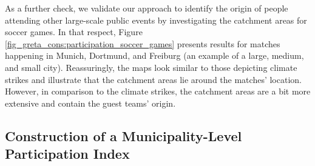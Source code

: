 As a further check, we validate our approach to identify the origin of people attending other large-scale public events by investigating the catchment areas for soccer games. In that respect, Figure \ref{fig_greta_cons:participation_soccer_games} presents results for matches happening in Munich, Dortmund, and Freiburg (an example of a large, medium, and small city). Reassuringly, the maps look similar to those depicting climate strikes and illustrate that the catchment areas lie around the matches' location. However, in comparison to the climate strikes, the catchment areas are a bit more extensive and contain the guest teams' origin.















\subsection{Construction of a Municipality-Level Participation Index}

